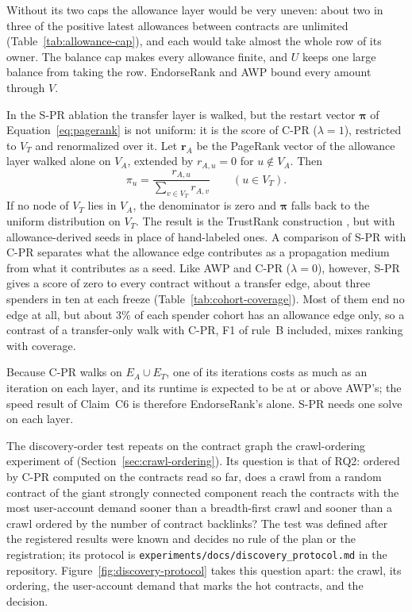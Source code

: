 Without its two caps the allowance layer would be very uneven: about two in three of the positive latest allowances between contracts are unlimited (Table~\ref{tab:allowance-cap}), and each would take almost the whole row of its owner. The balance cap makes every allowance finite, and $U$ keeps one large balance from taking the row. EndorseRank and AWP bound every amount through $V$.

In the \mbox{S-PR} ablation the transfer layer is walked, but the restart vector $\boldsymbol{\pi}$ of Equation~\eqref{eq:pagerank} is not uniform: it is the score of \mbox{C-PR} ($\lambda=1$), restricted to $V_T$ and renormalized over it. Let $\mathbf{r}_{A}$ be the PageRank vector of the allowance layer walked alone on $V_A$, extended by $r_{A,u}=0$ for $u\notin V_A$. Then
\[
\pi_u=\frac{r_{A,u}}{\sum_{v\in V_T} r_{A,v}}\qquad(u\in V_T).
\]
If no node of $V_T$ lies in $V_A$, the denominator is zero and $\boldsymbol{\pi}$ falls back to the uniform distribution on $V_T$. The result is the TrustRank construction \parencite{gyongyi2004trustrank}, but with allowance-derived seeds in place of hand-labeled ones. A comparison of \mbox{S-PR} with \mbox{C-PR} separates what the allowance edge contributes as a propagation medium from what it contributes as a seed. Like AWP and \mbox{C-PR} ($\lambda=0$), however, \mbox{S-PR} gives a score of zero to every contract without a transfer edge, about three spenders in ten at each freeze (Table~\ref{tab:cohort-coverage}). Most of them end no edge at all, but about $3\%$ of each spender cohort has an allowance edge only, so a contrast of a transfer-only walk with \mbox{C-PR}, F1 of rule~B included, mixes ranking with coverage.

Because \mbox{C-PR} walks on $E_A\cup E_T$, one of its iterations costs as much as an iteration on each layer, and its runtime is expected to be at or above AWP's; the speed result of Claim~C6 is therefore EndorseRank's alone. \mbox{S-PR} needs one solve on each layer.


The discovery-order test repeats on the contract graph the crawl-ordering experiment of \textcite{cho1998crawling} (Section~\ref{sec:crawl-ordering}). Its question is that of RQ2: ordered by \mbox{C-PR} computed on the contracts read so far, does a crawl from a random contract of the giant strongly connected component reach the contracts with the most user-account demand sooner than a breadth-first crawl and sooner than a crawl ordered by the number of contract backlinks? The test was defined after the registered results were known and decides no rule of the plan or the registration; its protocol is \texttt{experiments/docs/discovery\_protocol.md} in the repository. Figure~\ref{fig:discovery-protocol} takes this question apart: the crawl, its ordering, the user-account demand that marks the hot contracts, and the decision.

